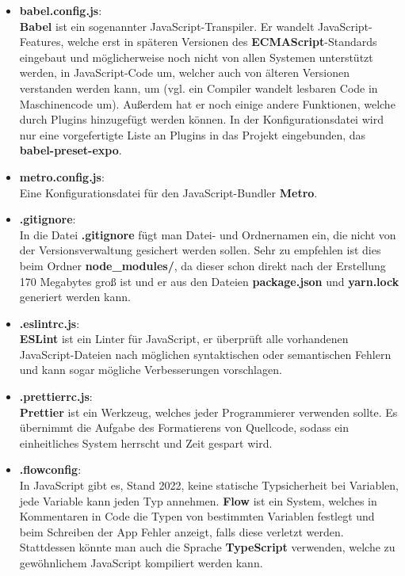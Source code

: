\begin{itemize}
\newpage

\item \textbf{babel.config.js}:\\
\textbf{Babel} ist ein sogenannter JavaScript-Transpiler. Er wandelt JavaScript-Features, welche erst in
späteren Versionen des \textbf{ECMAScript}-Standards eingebaut und möglicherweise noch nicht von allen
Systemen unterstützt werden, in JavaScript-Code um, welcher auch von älteren Versionen verstanden
werden kann, um (vgl. ein Compiler wandelt lesbaren Code in Maschinencode um). Außerdem hat er noch
einige andere Funktionen, welche durch Plugins hinzugefügt werden können. In der Konfigurationsdatei
wird nur eine vorgefertigte Liste an Plugins in das Projekt eingebunden, das \textbf{babel-preset-expo}.

\item \textbf{metro.config.js}:\\
Eine Konfigurationsdatei für den JavaScript-Bundler \textbf{Metro}.

\item \textbf{.gitignore}:\\
In die Datei \textbf{.gitignore} fügt man Datei- und Ordnernamen ein, die nicht von der Versionsverwaltung
gesichert werden sollen. Sehr zu empfehlen ist dies beim Ordner \textbf{node\_modules/}, da dieser schon
direkt nach der Erstellung 170 Megabytes groß ist und er aus den Dateien \textbf{package.json} und \textbf{yarn.lock}
generiert werden kann.

\item \textbf{.eslintrc.js}:\\
\textbf{ESLint} ist ein Linter für JavaScript, er überprüft alle vorhandenen JavaScript-Dateien nach
möglichen syntaktischen oder semantischen Fehlern und kann sogar mögliche Verbesserungen vorschlagen.

\item \textbf{.prettierrc.js}:\\
\textbf{Prettier} ist ein Werkzeug, welches jeder Programmierer verwenden sollte. Es übernimmt die Aufgabe
des Formatierens von Quellcode, sodass ein einheitliches System herrscht und Zeit gespart wird.

\item \textbf{.flowconfig}:\\
In JavaScript gibt es, Stand 2022, keine statische Typsicherheit bei Variablen, jede Variable kann
jeden Typ annehmen. \textbf{Flow} ist ein System, welches in Kommentaren in Code die Typen von bestimmten
Variablen festlegt und beim Schreiben der App Fehler anzeigt, falls diese verletzt werden.
Stattdessen könnte man auch die Sprache \textbf{TypeScript} verwenden, welche zu gewöhnlichem JavaScript
kompiliert werden kann.


\end{itemize}
